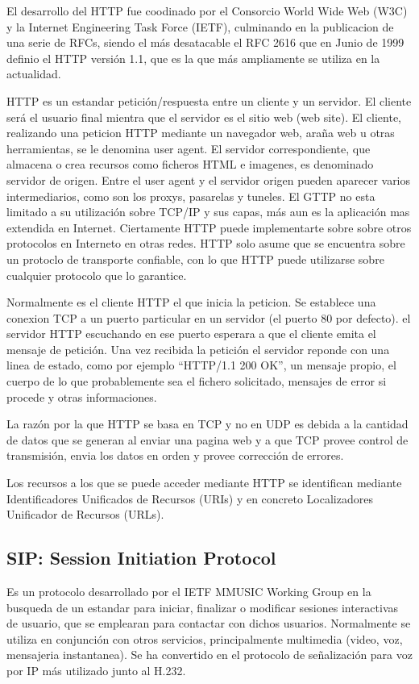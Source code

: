 \documentclass[a4paper,spanish,12pt]{book}
\begin{document}
El desarrollo del HTTP fue coodinado por el Consorcio World Wide Web (W3C) y la Internet Engineering Task Force (IETF), culminando en la publicacion de una serie de RFCs, siendo el más desatacable el RFC 2616 que en Junio de 1999 definio el HTTP versión 1.1, que es la que más ampliamente se utiliza en la actualidad.

HTTP es un estandar petición/respuesta entre un cliente y un servidor. El cliente será el usuario final mientra que el servidor es el sitio web (web site). El cliente, realizando una peticion HTTP mediante un navegador web, araña web u otras herramientas, se le denomina user agent. El servidor correspondiente, que almacena o crea recursos como ficheros HTML e imagenes, es denominado servidor de origen. Entre el user agent y el servidor origen pueden aparecer varios intermediarios, como son los proxys, pasarelas y tuneles. El GTTP no esta limitado a su utilización sobre TCP/IP y sus capas, más aun es la aplicación mas extendida en Internet. Ciertamente HTTP puede implementarte sobre sobre otros protocolos en Interneto en otras redes. HTTP solo asume que se encuentra sobre un protoclo de transporte confiable, con lo que HTTP puede utilizarse sobre cualquier protocolo que lo garantice.

Normalmente es el cliente HTTP el que inicia la peticion. Se establece una conexion TCP a un puerto particular en un servidor (el puerto 80 por defecto). el servidor HTTP escuchando en ese puerto esperara a que el cliente emita el mensaje de petición. Una vez recibida la petición el servidor reponde con una linea de estado, como por ejemplo ``HTTP/1.1 200 OK'',  un mensaje propio, el cuerpo de lo que probablemente sea el fichero solicitado, mensajes de error si procede y otras informaciones.

La razón por la que HTTP se basa en TCP y no en UDP es debida a la cantidad de datos que se generan al enviar una pagina web y a que TCP provee control de transmisión, envia los datos en orden y provee corrección de errores.

Los recursos a los que se puede acceder mediante HTTP se identifican mediante Identificadores Unificados de Recursos (URIs) y en concreto Localizadores Unificador de Recursos (URLs).


\subsection{SIP: Session Initiation Protocol} 

Es un protocolo desarrollado por el IETF MMUSIC Working Group en la busqueda de un estandar para iniciar, finalizar o modificar sesiones interactivas de usuario, que se emplearan para contactar con dichos usuarios. Normalmente se utiliza en conjunción con otros servicios, principalmente multimedia (video, voz, mensajeria instantanea). Se ha convertido en el protocolo de señalización para voz por IP más utilizado junto al H.232.
\end{document}
